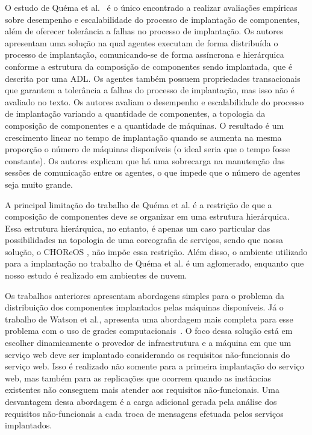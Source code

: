 O estudo de Quéma et al.~\cite{quema2004hierarchical} é o único encontrado a realizar avaliações empíricas sobre desempenho e escalabilidade do processo de implantação de componentes, além de oferecer tolerância a falhas no processo de implantação. Os autores apresentam uma solução na qual agentes executam de forma distribuída o processo de implantação, comunicando-se de forma assíncrona e hierárquica conforme a estrutura da composição de componentes sendo implantada, que é descrita por uma ADL. Os agentes também possuem propriedades transacionais que garantem a tolerância a falhas do processo de implantação, mas isso não é avaliado no texto. 
Os autores avaliam o desempenho e escalabilidade do processo de implantação variando a quantidade de componentes, a topologia da composição de componentes e a quantidade de máquinas. O resultado é um crescimento linear no tempo de implantação quando se aumenta na mesma proporção o número de máquinas disponíveis (o ideal seria que o tempo fosse constante). Os autores explicam que há uma sobrecarga na manutenção das sessões de comunicação entre os agentes, o que impede que o número de agentes seja muito grande. 

A principal limitação do trabalho de Quéma et al. é a restrição de que a composição de componentes deve se organizar em uma estrutura hierárquica. Essa estrutura hierárquica, no entanto, é apenas um caso particular das possibilidades na topologia de uma coreografia de serviços, sendo que nossa solução, o CHOReOS \ee, não impõe essa restrição. Além disso, o ambiente utilizado para a implantação no trabalho de Quéma et al. é um aglomerado, enquanto que nosso estudo é realizado em ambientes de nuvem.

Os trabalhos anteriores apresentam abordagens simples para o problema da distribuição dos componentes implantados pelas máquinas disponíveis. Já o trabalho de Watson et al., apresenta uma abordagem mais completa para esse problema com o uso de grades computacionais~\cite{Watson2006Dynasoar}. O foco dessa solução está em escolher dinamicamente o provedor de infraestrutura e a máquina em que um serviço web deve ser implantado considerando os requisitos não-funcionais do serviço web. Isso é realizado não somente para a primeira implantação do serviço web, mas também para as replicações que ocorrem quando as instâncias existentes não conseguem mais atender aos requisitos não-funcionais. Uma desvantagem dessa abordagem é a carga adicional gerada pela análise dos requisitos não-funcionais a cada troca de mensagens efetuada pelos serviços implantados. 

